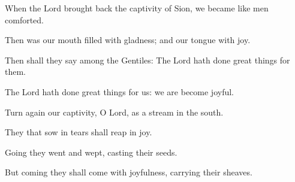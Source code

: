 \item When the Lord brought back the captivity of Sion, we became like men comforted.
\item Then was our mouth filled with gladness; and our tongue with joy.
\item Then shall they say among the Gentiles: The Lord hath done great things for them.
\item The Lord hath done great things for us: we are become joyful.
\item Turn again our captivity, O Lord, as a stream in the south.
\item They that sow in tears shall reap in joy.
\item Going they went and wept, casting their seeds.
\item But coming they shall come with joyfulness, carrying their sheaves.